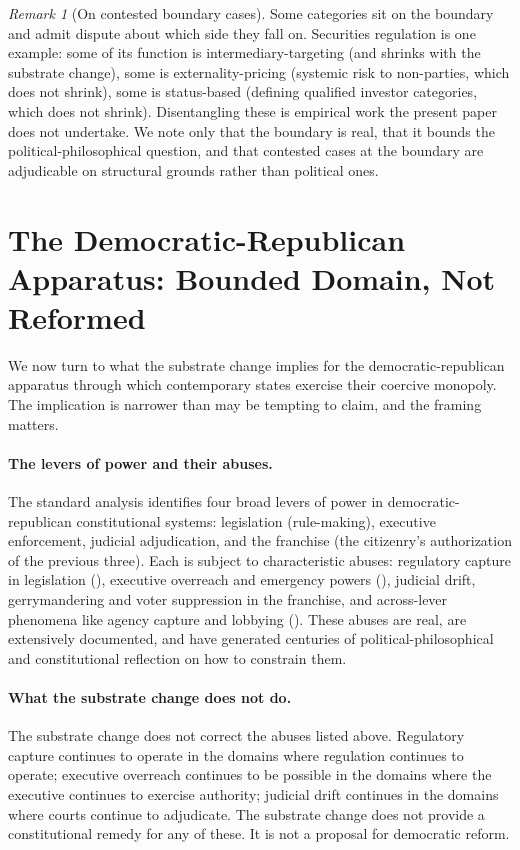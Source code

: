 \documentclass[11pt,a4paper]{article}
\theoremstyle{remark}
\newtheorem{remark}{Remark}[section]
\begin{document}
\begin{remark}[On contested boundary cases]
Some categories sit on the boundary and admit dispute about
which side they fall on. Securities regulation is one example:
some of its function is intermediary-targeting (and shrinks
with the substrate change), some is externality-pricing
(systemic risk to non-parties, which does not shrink), some is
status-based (defining qualified investor categories, which
does not shrink). Disentangling these is empirical work the
present paper does not undertake. We note only that the
boundary is real, that it bounds the political-philosophical
question, and that contested cases at the boundary are
adjudicable on structural grounds rather than political ones.
\end{remark}

\section{The Democratic-Republican Apparatus: Bounded Domain, Not Reformed}
\label{sec:apparatus}

We now turn to what the substrate change implies for the
democratic-republican apparatus through which contemporary states
exercise their coercive monopoly. The implication is narrower
than may be tempting to claim, and the framing matters.

\paragraph{The levers of power and their abuses.}
The standard analysis identifies four broad levers of power in
democratic-republican constitutional systems: legislation
(rule-making), executive enforcement, judicial adjudication, and
the franchise (the citizenry's authorization of the previous
three). Each is subject to characteristic abuses: regulatory
capture in legislation (\citealt{stigler1971economic}), executive
overreach and emergency powers
(\citealt{schmitt1922politicaltheology}), judicial drift,
gerrymandering and voter suppression in the franchise, and
across-lever phenomena like agency capture and lobbying
(\citealt{olson1965logic}). These abuses are real, are
extensively documented, and have generated centuries of
political-philosophical and constitutional reflection on how
to constrain them.

\paragraph{What the substrate change does not do.}
The substrate change does not correct the abuses listed above.
Regulatory capture continues to operate in the domains where
regulation continues to operate; executive overreach continues to
be possible in the domains where the executive continues to
exercise authority; judicial drift continues in the domains where
courts continue to adjudicate. The substrate change does not
provide a constitutional remedy for any of these. It is not a
proposal for democratic reform.
\end{document}
